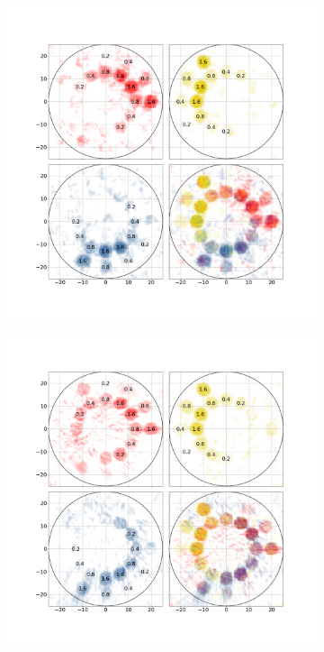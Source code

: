 \documentclass[12pt]{spieman}  %
\begin{document}
\begin{spacing}{1}
\begin{figure}
    \begin{subfigure}[t]{.35\textwidth}
      \centering
      \includegraphics[clip, trim={4cm 4cm 4cm 5cm}, scale = 0.15]{figures/RGB_xi8.png}
      \caption{}
      \label{fig:xi_8}
    \end{subfigure}%
    \begin{subfigure}[t]{.35\textwidth}
      \centering
      \includegraphics[clip, trim={4cm 4cm 4cm 5cm}, scale = 0.15]{figures/RGB_xi50.png}

\end{subfigure}
\end{figure}
\end{spacing}
\end{document}
